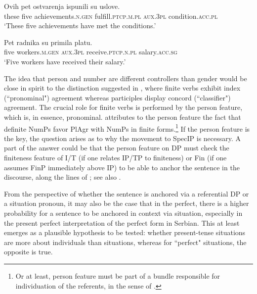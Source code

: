 \documentclass[output=paper,colorlinks,citecolor=brown
]{langscibook}
\begin{document}
\ea \label{ex:gender-neuter-to-masculine}
\gll Ovih pet ostvarenja ispunili su uslove. \\
these five achievements.\textsc{n.gen} fulfill.\textsc{ptcp.m.pl} \textsc{aux.3pl} condition.\textsc{acc.pl} \\
\glt ‘These five achievements have met the conditions.’  
\z

\ea  \label{ex:gender-masculine-to-neuter}
\gll Pet radnika su primila platu. \\  
five workers.\textsc{m.gen} \textsc{aux.3pl} receive.\textsc{ptcp.n.pl} salary.\textsc{acc.sg} \\  
\glt ‘Five workers have received their salary.’  
\z  

\noindent The idea that person and number are different controllers than gender would be close in spirit to the distinction suggested in \citet{Wechsler2011}, where finite verbs exhibit index (``pronominal") agreement whereas participles display concord (``classifier") agreement. The crucial role for finite verbs is performed by the person feature, which is, in essence, pronominal. \citet{Milosavljevic2017, Milosavljevic2018MS, Milosavljevic2018nasledje} attributes to the person feature the fact that definite NumPs favor PlAgr with NumPs in finite forms.\footnote{Or at least, person feature must be part of a bundle responsible for individuation of the referents, in the sense of \citet{Matushansky2014, Matushansky2015a, Matushansky2015}.} If the person feature is the key, the question arises as to why the movement to SpecIP is necessary. A part of the answer could be that the person feature on DP must check the finiteness feature of I/T (if one relates IP/TP to finiteness) or Fin (if one assumes FinP immediately above IP) to be able to anchor the sentence in the discourse, along the lines of \citet{Hinterholzl2019}; see also \citet{Bianchi2003}.

From the perspective of whether the sentence is anchored via a referential DP or a situation pronoun, it may also be the case that in the perfect, there is a higher probability for a sentence to be anchored in context via situation, especially in the present perfect interpretation of the perfect form in Serbian. This at least emerges as a plausible hypothesis to be tested: whether present-tense situations are more about individuals than situations, whereas for ``perfect" situations, the opposite is true.  
\end{document}
